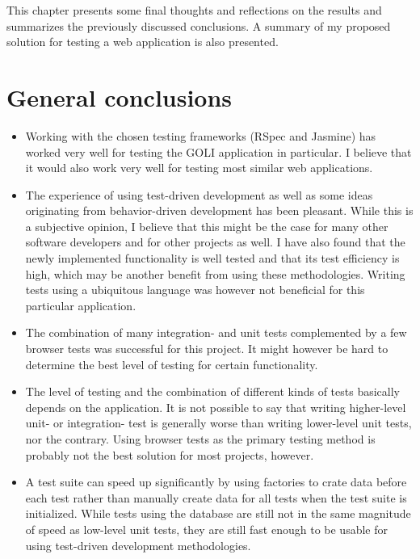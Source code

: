 
This chapter presents some final thoughts and reflections on the results
and summarizes the previously discussed conclusions. A summary of my
proposed solution for testing a web application is also presented.\\

\section{General conclusions}

\begin{itemize}

\item  Working with the chosen testing frameworks (RSpec and Jasmine)
has worked very well for testing the GOLI application in particular. I
believe that it would also work very well for testing most similar web
applications.\\

\item The experience of using test-driven development as well as some
ideas originating from behavior-driven development has been pleasant.
While this is a subjective opinion, I believe that this might be the
case for many other software developers and for other projects as well.
I have also found that the newly implemented functionality is well
tested and that its test efficiency is high, which may be another
benefit from using these methodologies. Writing tests using a
ubiquitous language was however not beneficial for this particular
application.\\

\item The combination of many integration- and unit tests complemented
by a few browser tests was successful for this project. It might however
be hard to determine the best level of testing for certain
functionality.\\

\item The level of testing and the combination of different kinds of
tests basically depends on the application. It is not possible to say
that writing higher-level unit- or integration- test is generally worse
than writing lower-level unit tests, nor the contrary. Using browser
tests as the primary testing method is probably not the best solution
for most projects, however.\\

\item A test suite can speed up significantly by using factories to
crate data before each test rather than manually create data for all
tests when the test suite is initialized. While tests using the database
are still not in the same magnitude of speed as low-level unit tests,
they are still fast enough to be usable for using test-driven
development methodologies.\\


\end{itemize}

